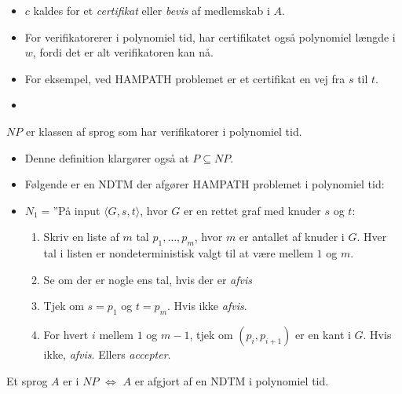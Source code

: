 \begin{frame}[allowframebreaks]
 \begin{itemize}
   \item $c$ kaldes for et \textit{certifikat} eller \textit{bevis} af medlemskab i $A$.
   \item For verifikatorerer i polynomiel tid, har certifikatet også polynomiel længde i $w$, fordi det er alt verifikatoren kan nå.
   \item For eksempel, ved HAMPATH problemet er et certifikat en vej fra $s$ til $t$.
   \item
 \end{itemize}
 \begin{definition}
$NP$ er klassen af sprog som har verifikatorer i polynomiel tid.
 \end{definition}
 \begin{itemize}
   \item Denne definition klargører også at $P \subseteq NP$.
   \item Følgende er en NDTM der afgører HAMPATH problemet i polynomiel tid:
   \item $N_{1} = $''På input \(\langle G, s, t \rangle\), hvor $G$ er en rettet graf med knuder $s$ og $t$:
         \begin{enumerate}
           \item Skriv en liste af $m$ tal $p_{1}, \ldots, p_{m}$, hvor $m$ er antallet af knuder i $G$. Hver tal i listen er nondeterministisk valgt til at være mellem $1$ og $m$.
           \item Se om der er nogle ens tal, hvis der er \textit{afvis}
           \item Tjek om $s = p_{1}$ og $t = p_{m}$. Hvis ikke \textit{afvis}.
           \item For hvert $i$ mellem $1$ og $m-1$, tjek om $(p_{i}, p_{i+1})$ er en kant i $G$. Hvis ikke, \textit{afvis}. Ellers \textit{accepter}.
         \end{enumerate}
 \end{itemize}

 \begin{theorem}
Et sprog $A$ er i $NP$ $\iff$ $A$ er afgjort  af en NDTM i polynomiel tid.
 \end{theorem}


\end{frame}
